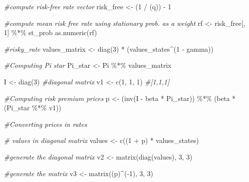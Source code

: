 \documentclass[
]{article}
\newenvironment{Shaded}{\begin{snugshade}}{\end{snugshade}}
\newcommand{\CommentTok}[1]{\textcolor[rgb]{0.56,0.35,0.01}{\textit{#1}}}
\newcommand{\DecValTok}[1]{\textcolor[rgb]{0.00,0.00,0.81}{#1}}
\newcommand{\FunctionTok}[1]{\textcolor[rgb]{0.00,0.00,0.00}{#1}}
\newcommand{\NormalTok}[1]{#1}
\newcommand{\OtherTok}[1]{\textcolor[rgb]{0.56,0.35,0.01}{#1}}
\newcommand{\SpecialCharTok}[1]{\textcolor[rgb]{0.00,0.00,0.00}{#1}}
\begin{document}
\begin{Shaded}
\begin{Highlighting}[]
    \CommentTok{\#compute risk{-}free rate vector}
\NormalTok{    risk\_free   }\OtherTok{\textless{}{-}}\NormalTok{   (}\DecValTok{1} \SpecialCharTok{/}\NormalTok{ (q)) }\SpecialCharTok{{-}} \DecValTok{1}

    \CommentTok{\#compute mean risk free rate using stationary prob. as a weight}
\NormalTok{    rf }\OtherTok{\textless{}{-}}\NormalTok{ risk\_free[, }\DecValTok{1}\NormalTok{] }\SpecialCharTok{\%*\%}\NormalTok{ st\_prob}
    \FunctionTok{as.numeric}\NormalTok{(rf)}

    \CommentTok{\#risky\_rate}
\NormalTok{    values\_matrix }\OtherTok{\textless{}{-}} \FunctionTok{diag}\NormalTok{(}\DecValTok{3}\NormalTok{) }\SpecialCharTok{*}\NormalTok{ (values\_states}\SpecialCharTok{\^{}}\NormalTok{(}\DecValTok{1} \SpecialCharTok{{-}}\NormalTok{ gamma))}

    \CommentTok{\#Computing Pi star}
\NormalTok{    Pi\_star }\OtherTok{\textless{}{-}}\NormalTok{  Pi }\SpecialCharTok{\%*\%}\NormalTok{ values\_matrix}

\NormalTok{    I       }\OtherTok{\textless{}{-}} \FunctionTok{diag}\NormalTok{(}\DecValTok{3}\NormalTok{) }\CommentTok{\#diagonal matrix}
\NormalTok{    v1      }\OtherTok{\textless{}{-}} \FunctionTok{c}\NormalTok{(}\DecValTok{1}\NormalTok{, }\DecValTok{1}\NormalTok{, }\DecValTok{1}\NormalTok{) }\CommentTok{\#[1,1,1]}

    \CommentTok{\#Computing risk premium prices }
\NormalTok{    p       }\OtherTok{\textless{}{-}}\NormalTok{ (}\FunctionTok{inv}\NormalTok{(I }\SpecialCharTok{{-}}\NormalTok{ beta }\SpecialCharTok{*}\NormalTok{ Pi\_star)) }\SpecialCharTok{\%*\%}\NormalTok{ (beta }\SpecialCharTok{*}\NormalTok{ (Pi\_star }\SpecialCharTok{\%*\%}\NormalTok{ v1))}
    
    \CommentTok{\#Converting prices in rates}

    \CommentTok{\# values in diagonal matrix}
\NormalTok{    values     }\OtherTok{\textless{}{-}} \FunctionTok{c}\NormalTok{((}\DecValTok{1} \SpecialCharTok{+}\NormalTok{ p) }\SpecialCharTok{*}\NormalTok{ values\_states)}

    \CommentTok{\#generate the diagonal matrix}
\NormalTok{    v2      }\OtherTok{\textless{}{-}} \FunctionTok{matrix}\NormalTok{(}\FunctionTok{diag}\NormalTok{(values), }\DecValTok{3}\NormalTok{, }\DecValTok{3}\NormalTok{)}

    \CommentTok{\#generate the matrix}
\NormalTok{    v3      }\OtherTok{\textless{}{-}} \FunctionTok{matrix}\NormalTok{((p)}\SpecialCharTok{\^{}}\NormalTok{(}\SpecialCharTok{{-}}\DecValTok{1}\NormalTok{), }\DecValTok{3}\NormalTok{, }\DecValTok{3}\NormalTok{)}
    

\end{Highlighting}
\end{Shaded}
\end{document}
